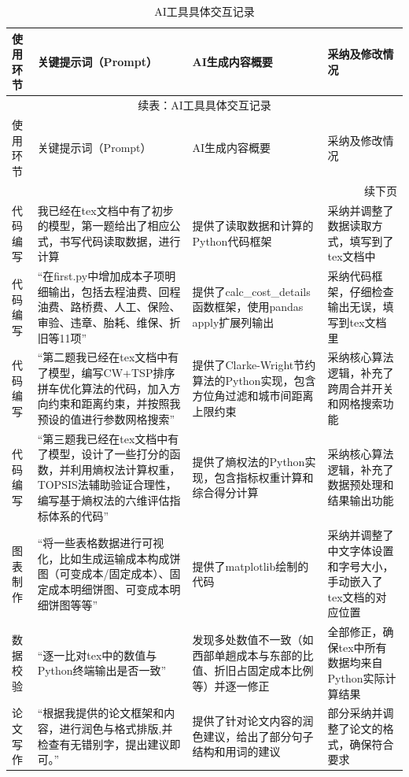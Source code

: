 \begin{longtable}{p{1.8cm}p{4.1cm}p{4.1cm}p{4.1cm}}
    \toprule[1.5pt]
    使用环节 & 关键提示词（Prompt） & AI生成内容概要 & 采纳及修改情况 \\
    \midrule[1pt]
    \endfirsthead
    \multicolumn{4}{c}{\small 续表：AI工具具体交互记录} \\
    \toprule[1.5pt]
    使用环节 & 关键提示词（Prompt） & AI生成内容概要 & 采纳及修改情况 \\
    \midrule[1pt]
    \endhead
    \midrule
    \multicolumn{4}{r}{\small 续下页} \\
    \endfoot
    \bottomrule[1.5pt]
    \caption{AI工具具体交互记录}
    \label{tab:ai-interactions}
    \endlastfoot
    代码编写 & 我已经在tex文档中有了初步的模型，第一题给出了相应公式，书写代码读取数据，进行计算 & 提供了读取数据和计算的Python代码框架 & 采纳并调整了数据读取方式，填写到了tex文档中 \\
        \midrule
        代码编写 & “在first.py中增加成本子项明细输出，包括去程油费、回程油费、路桥费、人工、保险、审验、违章、胎耗、维保、折旧等11项” & 提供了calc\_cost\_details函数框架，使用pandas apply扩展列输出 & 采纳代码框架，仔细检查输出无误，填写到tex文档里 \\
        \midrule
        代码编写 & “第二题我已经在tex文档中有了模型，编写CW+TSP排序拼车优化算法的代码，加入方向约束和距离约束，并按照我预设的值进行参数网格搜索” & 提供了Clarke-Wright节约算法的Python实现，包含方位角过滤和城市间距离上限约束 & 采纳核心算法逻辑，补充了跨周合并开关和网格搜索功能 \\
        \midrule
        代码编写 & “第三题我已经在tex文档中有了模型，设计了一些打分的函数，并利用熵权法计算权重，TOPSIS法辅助验证合理性，编写基于熵权法的六维评估指标体系的代码” & 提供了熵权法的Python实现，包含指标权重计算和综合得分计算 & 采纳核心算法逻辑，补充了数据预处理和结果输出功能 \\
        \midrule
        图表制作 & “将一些表格数据进行可视化，比如生成运输成本构成饼图（可变成本/固定成本）、固定成本明细饼图、可变成本明细饼图等等” & 提供了matplotlib绘制的代码 & 采纳并调整了中文字体设置和字号大小，手动嵌入了tex文档的对应位置\\
        \midrule
        数据校验 & “逐一比对tex中的数值与Python终端输出是否一致” & 发现多处数值不一致（如西部单趟成本与东部的比值、折旧占固定成本比例等）并逐一修正 & 全部修正，确保tex中所有数据均来自Python实际计算结果 \\
        \midrule
        论文写作 & “根据我提供的论文框架和内容，进行润色与格式排版,并检查有无错别字，提出建议即可。” & 提供了针对论文内容的润色建议，给出了部分句子结构和用词的建议 & 部分采纳并调整了论文的格式，确保符合要求 \\
\end{longtable}

